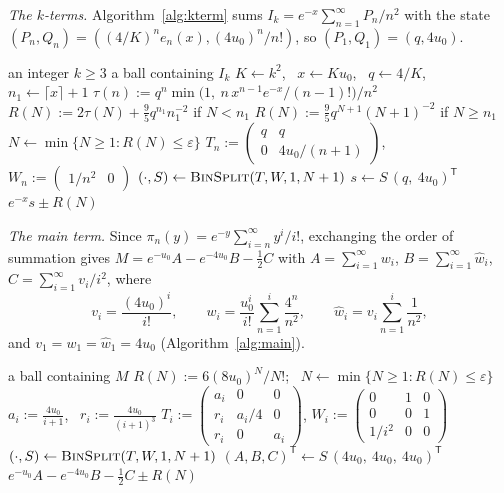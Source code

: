\emph{The $k$-terms.} Algorithm~\ref{alg:kterm} sums $I_k = e^{-x}\sum_{n=1}^{\infty}P_n/n^2$ with the state
$(P_n, Q_n) = ((4/K)^ne_n(x), (4u_0)^n/n!)$, so $(P_1, Q_1) = (q, 4u_0)$.

\begin{algorithm}[ht]
\caption{$\textsc{KTerm}(k)$}\label{alg:kterm}
\begin{algorithmic}[1]
\small
\Require an integer $k \ge 3$
\Ensure a ball containing $I_k$
\State $K \gets k^2$, \ $x \gets Ku_0$, \ $q \gets 4/K$, \ $n_1 \gets \lceil x\rceil + 1$
\State $\tau(n) := q^n\min\bigl(1,\ n\,x^{n-1}e^{-x}/(n-1)!\bigr)/n^2$
\State $R(N) := 2\tau(N) + \frac95q^{n_1}n_1^{-2}$ if $N < n_1$
\State $R(N) := \frac95q^{N+1}(N+1)^{-2}$ if $N \ge n_1$
\State $N \gets \min\{N \ge 1 : R(N) \le \varepsilon\}$
\State $T_n := \left(\begin{matrix} q & q \\ 0 & 4u_0/(n+1)\end{matrix}\right)$, \quad
  $W_n := \left(\begin{matrix} 1/n^2 & 0\end{matrix}\right)$
\State $(\cdot, S) \gets \textsc{BinSplit}(T, W, 1, N+1)$
\State $s \gets S\,(q,\ 4u_0)^{\mathsf T}$ 
\State \Return $e^{-x}s \pm R(N)$
\end{algorithmic}
\end{algorithm}

\emph{The main term.} Since $\pi_n(y) = e^{-y}\sum_{i=n}^{\infty}y^i/i!$, exchanging the order of summation gives
$M = e^{-u_0}A - e^{-4u_0}B - \frac12C$ with $A = \sum_{i=1}^{\infty}w_i$, $B = \sum_{i=1}^{\infty}\hat w_i$,
$C = \sum_{i=1}^{\infty}v_i/i^2$, where
\[
  v_i = \frac{(4u_0)^i}{i!}, \qquad w_i = \frac{u_0^i}{i!}\sum_{n=1}^{i}\frac{4^n}{n^2}, \qquad
  \hat w_i = v_i\sum_{n=1}^{i}\frac1{n^2},
\]
and $v_1 = w_1 = \hat w_1 = 4u_0$ (Algorithm~\ref{alg:main}).

\begin{algorithm}[ht]
\caption{$\textsc{MainTerm}()$}\label{alg:main}
\begin{algorithmic}[1]
\Ensure a ball containing $M$
\small
\State $R(N) := 6(8u_0)^N/N!$; \ $N \gets \min\{N \ge 1 : R(N) \le \varepsilon\}$
\State $a_i := \frac{4u_0}{i+1}$, \ $r_i := \frac{4u_0}{(i+1)^3}$
\State $T_i := \left(\begin{matrix} a_i & 0 & 0 \\ r_i & a_i/4 & 0 \\ r_i & 0 & a_i\end{matrix}\right)$, \quad
  $W_i := \left(\begin{matrix} 0 & 1 & 0 \\ 0 & 0 & 1 \\ 1/i^2 & 0 & 0\end{matrix}\right)$
\State $(\cdot, S) \gets \textsc{BinSplit}(T, W, 1, N+1)$
\State $(A, B, C)^{\mathsf T} \gets S\,(4u_0,\ 4u_0,\ 4u_0)^{\mathsf T}$
\State \Return $e^{-u_0}A - e^{-4u_0}B - \frac12C \pm R(N)$
\end{algorithmic}
\end{algorithm}

